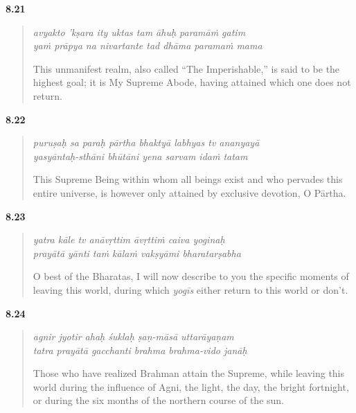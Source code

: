 \par\noindent\textbf{8.21}\par
\begin{verse}
\textit{avyakto ’kṣara ity uktas tam āhuḥ paramāṁ gatim} \\
\textit{yaṁ prāpya na nivartante tad dhāma paramaṁ mama}

\noindent This unmanifest realm, also called \enquote{The Imperishable,} is said to be the highest goal; it is My Supreme Abode, having attained which one does not return.
\end{verse}
\par



\par\noindent\textbf{8.22}\par
\begin{verse}
\textit{puruṣaḥ sa paraḥ pārtha bhaktyā labhyas tv ananyayā} \\
\textit{yasyāntaḥ-sthāni bhūtāni yena sarvam idaṁ tatam}

\noindent This Supreme Being within whom all beings exist and who pervades this entire universe, is however only attained by exclusive devotion, O Pārtha.
\end{verse}
\par



\par\noindent\textbf{8.23}\par
\begin{verse}
\textit{yatra kāle tv anāvṛttim āvṛttiṁ caiva yoginaḥ} \\
\textit{prayātā yānti taṁ kālaṁ vakṣyāmi bharatarṣabha}

\noindent O best of the Bharatas, I will now describe to you the specific moments of leaving this world, during which \textit{yogīs} either return to this world or don't.
\end{verse}
\par



\par\noindent\textbf{8.24}\par
\begin{verse}
\textit{agnir jyotir ahaḥ śuklaḥ ṣaṇ-māsā uttarāyaṇam} \\
\textit{tatra prayātā gacchanti brahma brahma-vido janāḥ}

\noindent Those who have realized Brahman attain the Supreme, while leaving this world during the influence of Agni, the light, the day, the bright fortnight, or during the six months of the northern course of the sun.
\end{verse}
\par



